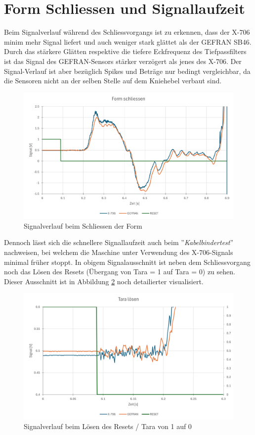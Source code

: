 \documentclass[12pt,a4paper]{article}
\begin{document}
\section{Form Schliessen und Signallaufzeit}
Beim Signalverlauf während des Schliessvorgangs ist zu erkennen, dass der X-706 minim mehr Signal liefert und auch weniger stark glättet als der GEFRAN SB46. Durch das stärkere Glätten respektive die tiefere Eckfrequenz des Tiefpassfilters ist das Signal des GEFRAN-Sensors stärker verzögert als jenes des X-706. Der Signal-Verlauf ist aber bezüglich Spikes und Beträge nur bedingt vergleichbar, da die Sensoren nicht an der selben Stelle auf dem Kniehebel verbaut sind.
\begin{figure}[H]
	\centering
	\includegraphics[width=1\linewidth]{imgs/form_schliessen}
	\caption{Signalverlauf beim Schliessen der Form}
	\label{fig:formschliessen}
\end{figure}\noindent
Dennoch lässt sich die schnellere Signallaufzeit auch beim ''\textit{Kabelbindertest}'' nachweisen, bei welchem die Maschine unter Verwendung des X-706-Signals minimal früher stoppt.
In obigem Signalausschnitt ist neben dem Schliessvorgang noch das Lösen des Resets (Übergang von Tara = 1 auf Tara = 0) zu sehen. Dieser Ausschnitt ist in Abbildung \ref{fig:taraloesen} noch detailierter visualisiert.
\begin{figure}[H]
	\centering
	\includegraphics[width=1\linewidth]{imgs/tara_loesen}
	\caption{Signalverlauf beim Lösen des Resets / Tara von 1 auf 0}
	\label{fig:taraloesen}
\end{figure}
\end{document}
